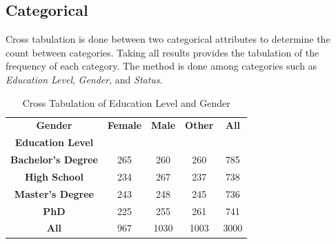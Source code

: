 \documentclass[journal]{IEEEtai}
\begin{document}
\subsection{Categorical}
Cross tabulation is done between two categorical attributes to determine the count between categories. Taking all results provides the tabulation of the frequency of each category. The method is done among categories such as {\it Education Level}, {\it Gender}, and {\it Status}.

\begin{table}[h]
  \centering
  \caption{Cross Tabulation of Education Level and Status}
\end{table}

\begin{table}[h]
  \centering
  \caption{Cross Tabulation of Education Level and Gender}
    \begin{tabular}{c c c c c}
      \hline
      \textbf{Gender} & \textbf{Female} & \textbf{Male} & \textbf{Other} & \textbf{All} \\
      \textbf{Education Level} \\
      \hline
      \textbf{Bachelor’s Degree} & 265 & 260 & 260 & 785 \\
      \textbf{High School} & 234 & 267 & 237 & 738 \\
      \textbf{Master’s Degree} & 243 & 248 & 245 & 736  \\
      \textbf{PhD} & 225 & 255 & 261 & 741 \\
      \hline
      \textbf{All} & 967 & 1030 & 1003 & 3000 \\
      \hline
    \end{tabular}
\end{table}
\end{document}
